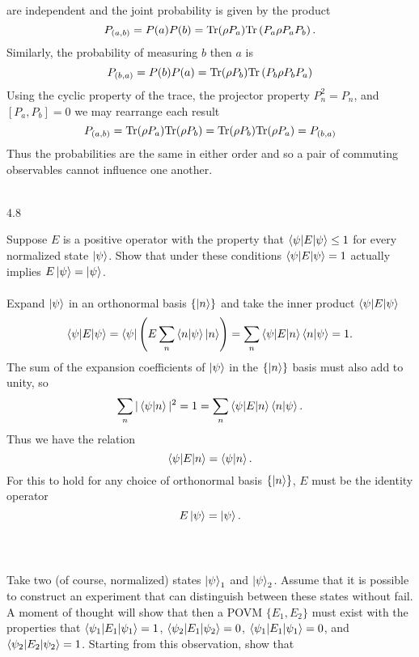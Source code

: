 \documentclass[10pt,letterpaper]{article}
\begin{document}
	are independent and the joint probability is given by the product 
	\[
		P_{(a,b)} = P(a)P(b) = \text{Tr}(\rho P_a)\text{Tr}\left( P_a\rho P_aP_b\right).
	\]
	Similarly, the probability of measuring $b$ then $a$ is
	\[
		P_{(b,a)} = P(b)P(a) =  \text{Tr}(\rho P_b)\text{Tr}\left(P_b\rho P_bP_a\right)
	\]
	Using the cyclic property of the trace, the projector property $P_n^2 = P_n$, and $[P_a,P_b] = 0$ we may rearrange 		each result
	\[
		P_{(a,b)} = \text{Tr}(\rho P_a)\text{Tr}(\rho P_b) = \text{Tr}(\rho P_b)\text{Tr}(\rho P_a) = P_{(b,a)}
	\]
	Thus the probabilities are the same in either order and so a pair of commuting observables cannot influence one another.
	\\ \\
	\eenum
	
	
		
	\item[4.8]
	\benum
	\item
	Suppose $E$ is a positive operator with the property that $\braket{\psi|E|\psi} \le 1$ for every normalized state
	$\ket\psi$. Show that under these conditions $\braket{\psi|E|\psi} = 1$ actually implies $E\ket\psi = \ket\psi$.
	\\ \\
	Expand $\ket\psi$ in an orthonormal basis $\{ \ket n\}$ and take the inner product $\braket{\psi|E|\psi}$
	\[
		\braket{\psi|E|\psi} = \bra\psi \left(E\sum_n \braket{n|\psi}\ket n\right) =  \sum_n \braket{\psi|E|n}\braket{n|\psi}
		=1.
	\]
	The sum of the expansion coefficients of $\ket\psi$ in the $\{\ket n\}$ basis must also add to unity, so
	\[
		\sum_n |\braket{\psi|n}|^2 = 1 = \sum_n \braket{\psi|E|n}\braket{n|\psi}.
	\]
	Thus we have the relation
	\[
		\braket{\psi|E|n} = \braket{\psi|n}.
	\]
	For this to hold for any choice of orthonormal basis $\{\ket n\}$, $E$ must be the identity operator
	\[
		E\ket\psi = \ket\psi.
	\]
	\\ \\
	\item
	Take two (of course, normalized) states $\ket\psi_1$ and $\ket\psi_2$. Assume that it is possible to construct an
	experiment that can distinguish between these states without fail. A moment of thought will show that then a POVM
	$\{ E_1,E_2\}$ must exist with the properties that $\braket{\psi_1|E_1|\psi_1} = 1$, $\braket{\psi_2|E_1|\psi_2} = 0$,
	$\braket{\psi_1|E_1|\psi_1} = 0$, and $\braket{\psi_2|E_2|\psi_2} = 1$. Starting from this observation, show that
\end{document}
